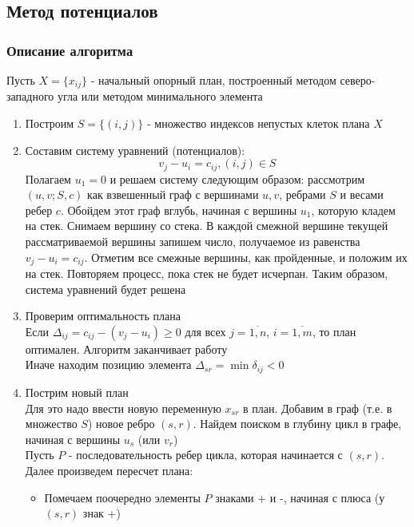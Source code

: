 \subsection{Метод потенциалов}
\subsubsection{Описание алгоритма}
Пусть $X=\{x_{ij}\}$ - начальный опорный план, построенный методом северо-западного угла или методом минимального элемента
\begin{enumerate}
	\item	Построим $S=\{(i,j)\}$ - множество индексов непустых клеток плана $X$
	
	\item Составим систему уравнений (потенциалов):
	\begin{equation*} 
	v_j-u_i=c_{ij}, (i,j)\in S
	\end{equation*}
	Полагаем $u_1=0$ и решаем систему следующим образом: рассмотрим $(u,v;S,c)$ как взвешенный граф с вершинами $u,v$, ребрами $S$ и весами ребер $c$. Обойдем этот граф вглубь, начиная с вершины $u_1$, которую кладем на стек. Снимаем вершину со стека. В каждой смежной вершине текущей рассматриваемой вершины запишем число, получаемое из равенства $v_j-u_i=c_{ij}$. Отметим все смежные вершины, как пройденные, и положим их на стек. Повторяем процесс, пока стек не будет исчерпан. Таким образом, система уравнений будет решена
	
	\item Проверим оптимальность плана \\
	Если $\Delta_{ij}=c_{ij}-(v_j-u_i)\geq0$ для всех $j=\overline{1,n}$, $i=\overline{1,m}$, то план оптимален. Алгоритм заканчивает работу\\
	Иначе находим позицию элемента $\Delta_{sr}=\min \delta_{ij} < 0$
	
	\item Пострим новый план \\
	Для это надо ввести новую переменную $x_{sr}$ в план. Добавим в граф (т.е. в множество $S$) новое ребро $(s,r)$. Найдем поиском в глубину цикл в графе, начиная с вершины $u_s$ (или $v_r$) \\
	Пусть $P$ - последовательность ребер цикла, которая начинается с $(s,r)$. Далее произведем пересчет плана:
	\begin{itemize}
		\item Помечаем поочередно элементы $P$ знаками + и -, начиная с плюса (у $(s,r)$ знак +)
		

\end{itemize}
\end{enumerate}
